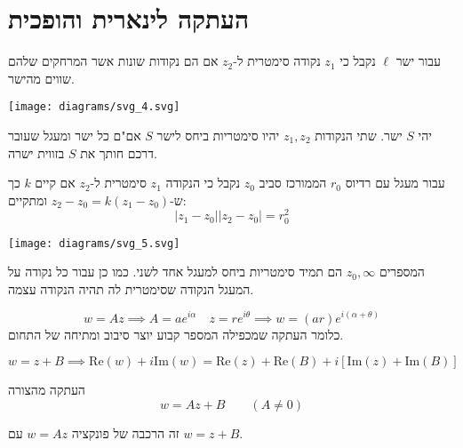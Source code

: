 \documentclass{tstextbook}
\begin{document}
\section{העתקה לינארית והופכית}

\begin{definition}
עבור ישר \(\ell\) נקבל כי \(z_{1}\) נקודה סימטרית ל-\(z_{2}\) אם הם נקודות שונות אשר המרחקים שלהם שווים מהישר.

\end{definition}
\texttt{[image: diagrams/svg\_4.svg]}
\begin{proposition}
יהי \(S\) ישר. שתי הנקודות \(z_{1},z_{2}\) יהיו סימטריות ביחס לישר \(S\) אם"ם כל ישר ומעגל שעובר דרכם חותך את \(S\) בזווית ישרה. 

\end{proposition}
\begin{definition}
עבור מעגל עם רדיוס \(r_{0}\) הממורכז סביב \(z_{0}\) נקבל כי הנקודה \(z_{1}\) סימטרית ל-\(z_{2}\) אם קיים \(k\) כך ש-\(z_{2}-z_{0}=k(z_{1}-z_{0})\) ומתקיים:
$$|z_{1}-z_{0}||z_{2}-z_{0}|=r_{0}^2$$

\end{definition}
\texttt{[image: diagrams/svg\_5.svg]}
\begin{remark}
המספרים \(z_{0},\infty\) הם תמיד סימטריות ביחס למעגל אחד לשני. כמו כן עבור כל נקודה על המעגל הנקודה שסימטרית לה תהיה הנקודה עצמה.

\end{remark}
\begin{proposition}
$$w=Az\implies A=a e^{i\alpha}\quad  z=r e^{i\theta}\implies w=(a r)e^{i\left( \alpha+\theta \right)}$$
כלומר העתקה שמכפילה המספר קבוע יוצר סיבוב ומתיחה של התחום.

\end{proposition}
\begin{proposition}
$$w=z+B\implies \mathrm{Re}(w)+i\mathrm{Im}(w)=\mathrm{Re}(z)+\mathrm{Re}(B)+i\left[ \mathrm{Im}(z)+\mathrm{Im}(B) \right]$$

\end{proposition}
\begin{definition}
העתקה מהצורה
$$w=A z+B\qquad(A\neq0)$$

\end{definition}
\begin{remark}
זה הרכבה של פונקציה \(w=Az\) עם \(w=z+B\).

\end{remark}
\end{document}
